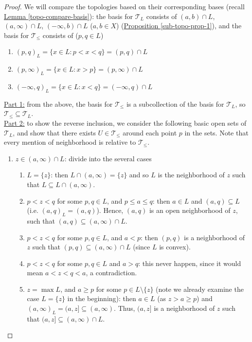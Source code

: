 \documentclass{treatise}
\begin{document}
\begin{proof}
We will compare the topologies based on their corresponding bases (recall \hyperref[topo-compare-basis]{Lemma \ref*{topo-compare-basis}}): the basis for $\mathcal{T}_L$ consists of $(a, b) \cap L$, $(a, \infty) \cap L$, $(-\infty, b) \cap L$ ($a, b \in X$) (\hyperref[sub-topo-prop-1]{Proposition \ref*{sub-topo-prop-1}}), and the basis for $\mathcal{T}_{\leq}$ consists of ($p, q \in L$)
\begin{enumerate}
    \item $(p, q)_L = \{ x \in L : p < x < q \} = (p, q) \cap L$
    \item $(p, \infty)_L = \{ x \in L : x > p \} = (p, \infty) \cap L$
    \item $(-\infty, q)_L = \{ x \in L : x < q \} = (-\infty, q) \cap L$
\end{enumerate}
\underline{Part 1:} from the above, the basis for $\mathcal{T}_{\leq}$ is a subcollection of the basis for $\mathcal{T}_L$, so $\mathcal{T}_{\leq} \subseteq \mathcal{T}_L$.
\\
\underline{Part 2:} to show the reverse inclusion, we consider the following basic open sets of $\mathcal{T}_L$, and show that there exists $U \in \mathcal{T}_{\leq}$ around each point $p$ in the sets. Note that every mention of neighborhood is relative to $\mathcal{T}_{\leq}$.
\begin{enumerate}
    \item $z \in (a, \infty) \cap L$: divide into the several cases
    \begin{enumerate}
        \item $L = \{ z \}$: then $L \cap (a, \infty) = \{ z \}$ and so $L$ is the neighborhood of $z$ such that $L \subseteq L \cap (a, \infty)$.
        \item $p < z < q$ for some $p, q \in L$, and $p \leq a \leq q$: then $a \in L$ and $(a, q) \subseteq L$ (i.e. $(a, q)_L = (a, q)$). Hence, $(a, q)$ is an open neighborhood of $z$, such that $(a, q) \subseteq (a, \infty) \cap L$.
        \item $p < z < q$ for some $p, q \in L$, and $a < p$: then $(p, q)$ is a neighborhood of $z$ such that $(p, q) \subseteq (a, \infty) \cap L$ (since $L$ is convex).
        \item $p < z < q$ for some $p, q \in L$ and $a > q$: this never happen, since it would mean $a < z < q < a$, a contradiction.
        \item $z = \max L$, and $a \geq p$ for some $p \in L \setminus \{ z \}$ (note we already examine the case $L = \{ z \}$ in the beginning): then $a \in L$ (as $z > a \geq p$) and $(a, \infty)_L = (a, z] \subseteq (a, \infty)$. Thus, $(a, z]$ is a neighborhood of $z$ such that $(a, z] \subseteq (a, \infty) \cap L$.

\end{enumerate}
\end{enumerate}
\end{proof}
\end{document}
